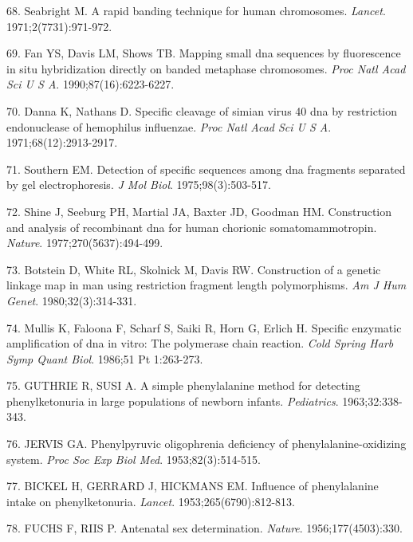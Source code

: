 \documentclass[11pt,letterpaper]{book}
\begin{document}
\leavevmode\hypertarget{ref-seabright:1971aa}{}%
68. Seabright M. A rapid banding technique for human chromosomes. \emph{Lancet}. 1971;2(7731):971-972.

\leavevmode\hypertarget{ref-fan:1990aa}{}%
69. Fan YS, Davis LM, Shows TB. Mapping small dna sequences by fluorescence in situ hybridization directly on banded metaphase chromosomes. \emph{Proc Natl Acad Sci U S A}. 1990;87(16):6223-6227.

\leavevmode\hypertarget{ref-danna:1971aa}{}%
70. Danna K, Nathans D. Specific cleavage of simian virus 40 dna by restriction endonuclease of hemophilus influenzae. \emph{Proc Natl Acad Sci U S A}. 1971;68(12):2913-2917.

\leavevmode\hypertarget{ref-southern:1975aa}{}%
71. Southern EM. Detection of specific sequences among dna fragments separated by gel electrophoresis. \emph{J Mol Biol}. 1975;98(3):503-517.

\leavevmode\hypertarget{ref-shine:1977aa}{}%
72. Shine J, Seeburg PH, Martial JA, Baxter JD, Goodman HM. Construction and analysis of recombinant dna for human chorionic somatomammotropin. \emph{Nature}. 1977;270(5637):494-499.

\leavevmode\hypertarget{ref-botstein:1980aa}{}%
73. Botstein D, White RL, Skolnick M, Davis RW. Construction of a genetic linkage map in man using restriction fragment length polymorphisms. \emph{Am J Hum Genet}. 1980;32(3):314-331.

\leavevmode\hypertarget{ref-mullis:1986aa}{}%
74. Mullis K, Faloona F, Scharf S, Saiki R, Horn G, Erlich H. Specific enzymatic amplification of dna in vitro: The polymerase chain reaction. \emph{Cold Spring Harb Symp Quant Biol}. 1986;51 Pt 1:263-273.

\leavevmode\hypertarget{ref-guthrie:1963aa}{}%
75. GUTHRIE R, SUSI A. A simple phenylalanine method for detecting phenylketonuria in large populations of newborn infants. \emph{Pediatrics}. 1963;32:338-343.

\leavevmode\hypertarget{ref-jervis:1953aa}{}%
76. JERVIS GA. Phenylpyruvic oligophrenia deficiency of phenylalanine-oxidizing system. \emph{Proc Soc Exp Biol Med}. 1953;82(3):514-515.

\leavevmode\hypertarget{ref-bickel:1953aa}{}%
77. BICKEL H, GERRARD J, HICKMANS EM. Influence of phenylalanine intake on phenylketonuria. \emph{Lancet}. 1953;265(6790):812-813.

\leavevmode\hypertarget{ref-fuchs:1956aa}{}%
78. FUCHS F, RIIS P. Antenatal sex determination. \emph{Nature}. 1956;177(4503):330.
\end{document}

